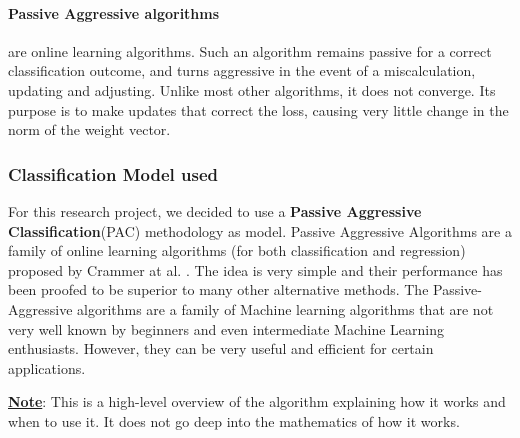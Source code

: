 \documentclass[11.5pt]{article}
\begin{document}
\begin{multicols}{2}
\paragraph{Passive Aggressive algorithms}
are online learning algorithms. Such an algorithm remains passive for a correct classification outcome, and turns aggressive in the event of a miscalculation, updating and adjusting. Unlike most other algorithms, it does not converge. Its purpose is to make updates that correct the loss, causing very little change in the norm of the weight vector.

\subsubsection{Classification Model used}
For this research project, we decided to use a \textbf{Passive Aggressive Classification}(PAC) methodology as model.
\newline
Passive Aggressive Algorithms are a family of online learning algorithms (for both classification and regression) proposed by Crammer at al. \citep{crammer}.
The idea is very simple and their performance has been proofed to be superior to many other alternative methods.
\newline
The Passive-Aggressive algorithms are a family of Machine learning algorithms that are not very well known by beginners and even intermediate Machine Learning enthusiasts. However, they can be very useful and efficient for certain applications.\cite{geeksforgeeks}

\underline{\textbf{Note}}: This is a high-level overview of the algorithm explaining how it works and when to use it. It does not go deep into the mathematics of how it works.


\end{multicols}
\end{document}

